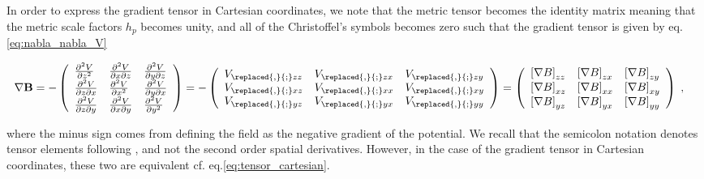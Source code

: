 \documentclass[extra,mreferee]{gji}
\begin{document}
In order to express the gradient tensor in Cartesian coordinates, we note that the metric tensor becomes the identity matrix meaning that the metric scale factors $h_p$ becomes unity, and all of the Christoffel's symbols becomes zero such that the gradient tensor is given by eq.\eqref{eq:nabla_nabla_V}

\begin{align}
\nabla \mathbf{B} &=  - \left(
\begin{array}{lll}
\frac{\partial^2 V}{\partial z^2}          & \frac{\partial^2 V}{\partial x \partial z} & \frac{\partial^2 V}{\partial y \partial z} \\
\frac{\partial^2 V}{\partial z \partial x} & \frac{\partial^2 V}{\partial x^2}          & \frac{\partial^2 V}{\partial y \partial x} \\
\frac{\partial^2 V}{\partial z \partial y} & \frac{\partial^2 V}{\partial x \partial y} & \frac{\partial^2 V}{\partial y^2}
\end{array}\right)= 
- \left(
\begin{array}{lll}
V_{\replaced{,}{;}zz}          & V_{\replaced{,}{;}zx}  & V_{\replaced{,}{;}zy} \\
V_{\replaced{,}{;}xz}          & V_{\replaced{,}{;}xx}  & V_{\replaced{,}{;}xy} \\
V_{\replaced{,}{;}yz}          & V_{\replaced{,}{;}yx}  & V_{\replaced{,}{;}yy}
\end{array}\right) =
\left(
\begin{array}{lll}
\left[\nabla B\right]_{zz}          & \left[\nabla B\right]_{zx}  & \left[\nabla B\right]_{zy} \\
\left[\nabla B\right]_{xz}          & \left[\nabla B\right]_{xx}  & \left[\nabla B\right]_{xy} \\
\left[\nabla B\right]_{yz}          & \left[\nabla B\right]_{yx}  & \left[\nabla B\right]_{yy}
\end{array}\right) \;,  \label{eq:tensor_cartesian}
\end{align}

where the minus sign comes from defining the field as the negative gradient of the potential. We recall that the semicolon notation denotes tensor elements following \cite{Casotto_Fantino_2009}, and not the second order spatial derivatives. However, in the case of the gradient tensor in Cartesian coordinates, these two are equivalent cf. eq.\eqref{eq:tensor_cartesian}.   
\end{document}
